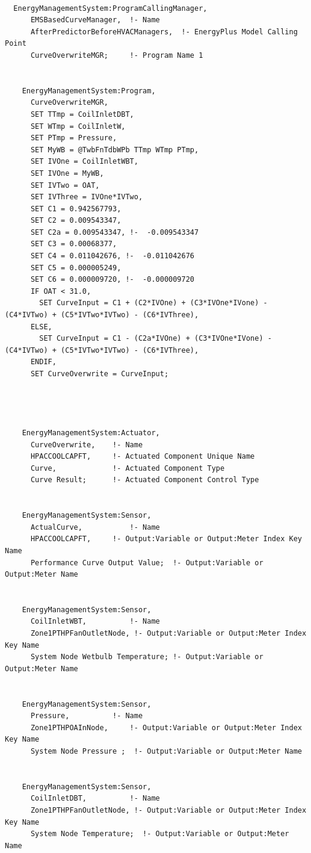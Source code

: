 \begin{lstlisting}

  EnergyManagementSystem:ProgramCallingManager,
      EMSBasedCurveManager,  !- Name
      AfterPredictorBeforeHVACManagers,  !- EnergyPlus Model Calling Point
      CurveOverwriteMGR;     !- Program Name 1


    EnergyManagementSystem:Program,
      CurveOverwriteMGR,
      SET TTmp = CoilInletDBT,
      SET WTmp = CoilInletW,
      SET PTmp = Pressure,
      SET MyWB = @TwbFnTdbWPb TTmp WTmp PTmp,
      SET IVOne = CoilInletWBT,
      SET IVOne = MyWB,
      SET IVTwo = OAT,
      SET IVThree = IVOne*IVTwo,
      SET C1 = 0.942567793,
      SET C2 = 0.009543347,
      SET C2a = 0.009543347, !-  -0.009543347
      SET C3 = 0.00068377,
      SET C4 = 0.011042676, !-  -0.011042676
      SET C5 = 0.000005249,
      SET C6 = 0.000009720, !-  -0.000009720
      IF OAT < 31.0,
        SET CurveInput = C1 + (C2*IVOne) + (C3*IVOne*IVone) - (C4*IVTwo) + (C5*IVTwo*IVTwo) - (C6*IVThree),
      ELSE,
        SET CurveInput = C1 - (C2a*IVOne) + (C3*IVOne*IVone) - (C4*IVTwo) + (C5*IVTwo*IVTwo) - (C6*IVThree),
      ENDIF,
      SET CurveOverwrite = CurveInput;




    EnergyManagementSystem:Actuator,
      CurveOverwrite,    !- Name
      HPACCOOLCAPFT,     !- Actuated Component Unique Name
      Curve,             !- Actuated Component Type
      Curve Result;      !- Actuated Component Control Type


    EnergyManagementSystem:Sensor,
      ActualCurve,           !- Name
      HPACCOOLCAPFT,     !- Output:Variable or Output:Meter Index Key Name
      Performance Curve Output Value;  !- Output:Variable or Output:Meter Name


    EnergyManagementSystem:Sensor,
      CoilInletWBT,          !- Name
      Zone1PTHPFanOutletNode, !- Output:Variable or Output:Meter Index Key Name
      System Node Wetbulb Temperature; !- Output:Variable or Output:Meter Name


    EnergyManagementSystem:Sensor,
      Pressure,          !- Name
      Zone1PTHPOAInNode,     !- Output:Variable or Output:Meter Index Key Name
      System Node Pressure ;  !- Output:Variable or Output:Meter Name


    EnergyManagementSystem:Sensor,
      CoilInletDBT,          !- Name
      Zone1PTHPFanOutletNode, !- Output:Variable or Output:Meter Index Key Name
      System Node Temperature;  !- Output:Variable or Output:Meter Name



\end{lstlisting}
